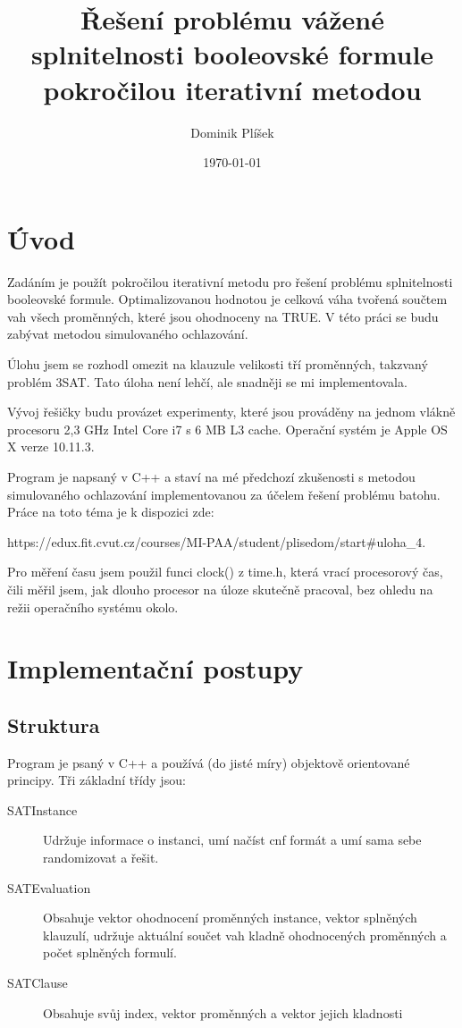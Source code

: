 \documentclass[12pt,a4paper]{article}
\begin{document}
\title{Řešení problému vážené splnitelnosti booleovské formule pokročilou iterativní metodou}
\author{Dominik Plíšek}
\date{\dmyyyydate\today}
\maketitle

\tableofcontents


\section{Úvod}

Zadáním je použít pokročilou iterativní metodu pro řešení problému splnitelnosti booleovské formule. Optimalizovanou hodnotou je celková váha tvořená součtem vah všech proměnných, které jsou ohodnoceny na TRUE. V této práci se budu zabývat metodou simulovaného ochlazování. 

Úlohu jsem se rozhodl omezit na klauzule velikosti tří proměnných, takzvaný problém 3SAT. Tato úloha není lehčí, ale snadněji se mi implementovala.

Vývoj řešičky budu provázet experimenty, které jsou prováděny na jednom vlákně procesoru 2,3 GHz Intel Core i7 s 6 MB L3 cache. Operační systém je Apple OS X verze 10.11.3.

Program je napsaný v C++ a staví na mé předchozí zkušenosti s metodou simulovaného ochlazování implementovanou za účelem řešení problému batohu. Práce na toto téma je k dispozici zde:

https://edux.fit.cvut.cz/courses/MI-PAA/student/plisedom/start\#uloha\_4.

Pro měření času jsem použil funci clock() z time.h, která vrací procesorový čas, čili měřil jsem, jak dlouho procesor na úloze skutečně pracoval, bez ohledu na režii operačního systému okolo.



\section{Implementační postupy}

\subsection{Struktura}
\label{structure}

Program je psaný v C++ a používá (do jisté míry) objektově orientované principy. Tři základní třídy jsou:

\begin{description}
    \item[SATInstance] Udržuje informace o instanci, umí načíst cnf formát a umí sama sebe randomizovat a řešit.
    \item[SATEvaluation] Obsahuje vektor ohodnocení proměnných instance, vektor splněných klauzulí, udržuje aktuální součet vah kladně ohodnocených proměnných a počet splněných formulí.
    \item[SATClause] Obsahuje svůj index, vektor proměnných a vektor jejich kladnosti
\end{description}
\end{document}
